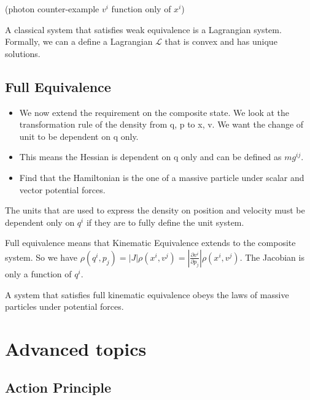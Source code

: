 \documentclass{article}[a4paper]
\begin{document}
(photon counter-example $v^i$ function only of $x^i$)

\begin{prop}
	A classical system that satisfies weak equivalence is a Lagrangian system. Formally, we can a define a Lagrangian $\mathcal{L}$ that is convex and has unique solutions.
\end{prop}

\subsection{Full Equivalence}

\begin{itemize}
	\item We now extend the requirement on the composite state. We look at the transformation rule of the density from q, p to x, v. We want the change of unit to be dependent on q only.
	
	\item This means the Hessian is dependent on q only and can be defined as $m g^{ij}$.
	
	\item Find that the Hamiltonian is the one of a massive particle under scalar and vector potential forces.
\end{itemize}

The units that are used to express the density on position and velocity must be dependent only on $q^i$ if they are to fully define the unit system.

\begin{defn}
	Full equivalence means that Kinematic Equivalence extends to the composite system. So we have $\rho(q^i,p_j) = \left|J\right|\rho(x^i,v^j) = \left|\frac{\partial v^i}{\partial p_j}\right|\rho(x^i,v^j)$. The Jacobian is only a function of $q^i$.
\end{defn}

\begin{prop}
	A system that satisfies full kinematic equivalence obeys the laws of massive particles under potential forces.
\end{prop}

\section{Advanced topics}

\subsection{Action Principle}
\end{document}
